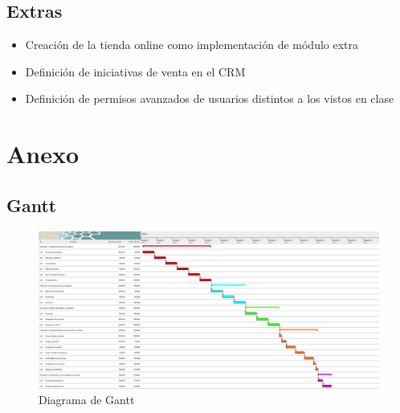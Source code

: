 \documentclass{report}
\begin{document}
      \clearpage\section*{Extras}
        \begin{itemize}
          \item Creación de la tienda online como implementación de módulo extra
          \item Definición de iniciativas de venta en el CRM
          \item Definición de permisos avanzados de usuarios distintos a los vistos en clase
        \end{itemize}
    \chapter{Anexo}
      \section{Gantt}
        \begin{figure}[H]
          \centering
          \includegraphics[width=1\textwidth]{./img/gantt.png}
          \caption{Diagrama de Gantt}
        \end{figure}
    
    
\end{document}
